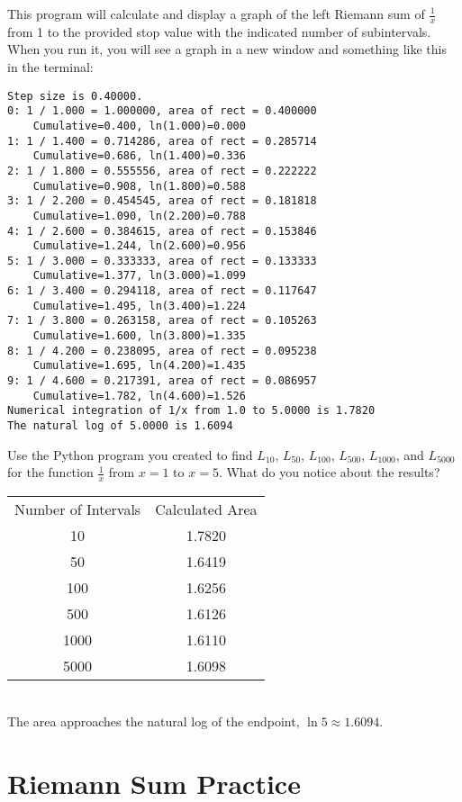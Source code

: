 This program will calculate and display a graph of the left Riemann sum of $\frac{1}{x}$ from 1 to the provided stop value with the indicated number of subintervals. When you run it, you will see a graph in a new window and something like this in the terminal:
\begin{Verbatim}
Step size is 0.40000.
0: 1 / 1.000 = 1.000000, area of rect = 0.400000 
	Cumulative=0.400, ln(1.000)=0.000
1: 1 / 1.400 = 0.714286, area of rect = 0.285714 
	Cumulative=0.686, ln(1.400)=0.336
2: 1 / 1.800 = 0.555556, area of rect = 0.222222 
	Cumulative=0.908, ln(1.800)=0.588
3: 1 / 2.200 = 0.454545, area of rect = 0.181818 
	Cumulative=1.090, ln(2.200)=0.788
4: 1 / 2.600 = 0.384615, area of rect = 0.153846 
	Cumulative=1.244, ln(2.600)=0.956
5: 1 / 3.000 = 0.333333, area of rect = 0.133333 
	Cumulative=1.377, ln(3.000)=1.099
6: 1 / 3.400 = 0.294118, area of rect = 0.117647 
	Cumulative=1.495, ln(3.400)=1.224
7: 1 / 3.800 = 0.263158, area of rect = 0.105263 
	Cumulative=1.600, ln(3.800)=1.335
8: 1 / 4.200 = 0.238095, area of rect = 0.095238 
	Cumulative=1.695, ln(4.200)=1.435
9: 1 / 4.600 = 0.217391, area of rect = 0.086957 
	Cumulative=1.782, ln(4.600)=1.526
Numerical integration of 1/x from 1.0 to 5.0000 is 1.7820
The natural log of 5.0000 is 1.6094
\end{Verbatim}

\begin{Exercise}[label=rsumpython]
Use the Python program you created to find $L_{10}$, $L_{50}$, $L_{100}$, $L_{500}$, $L_{1000}$, and $L_{5000}$ for the function $\frac{1}{x}$ from $x=1$ to $x=5$. What do you notice about the results?
\end{Exercise}

\begin{Answer}[ref=rsumpython]
	\begin{tabular}{c|c}
	Number of Intervals & Calculated Area\\
	10 & 1.7820 \\
	50 & 1.6419 \\
	100 & 1.6256 \\
	500 & 1.6126 \\
	1000 & 1.6110 \\
	5000 & 1.6098 \\
	\end{tabular}
	\\The area approaches the natural log of the endpoint, $\ln{5} \approx 1.6094$. 
\end{Answer}

\section{Riemann Sum Practice}

